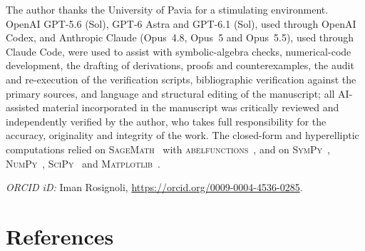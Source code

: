 \documentclass[12pt]{iopart}
\theoremstyle{plain}
\theoremstyle{definition}
\theoremstyle{plain}
\theoremstyle{remark}
\begin{document}
\ack
The author thanks the University of Pavia for a stimulating environment. OpenAI
GPT-5.6 (Sol), GPT-6 Astra and GPT-6.1 (Sol), used through OpenAI Codex, and Anthropic
Claude (Opus~4.8, Opus~5 and Opus~5.5), used through Claude Code, were used to assist with symbolic-algebra checks, numerical-code development,
the drafting of derivations, proofs and counterexamples, the audit and re-execution of the
verification scripts, bibliographic verification against the primary sources, and language
and structural editing of the manuscript; all AI-assisted material incorporated in the
manuscript was critically reviewed and independently verified by the author,
who takes full responsibility for the accuracy, originality and integrity of the work. The
closed-form and hyperelliptic computations relied on \textsc{SageMath}~\cite{SageMath}
with \textsc{abelfunctions}~\cite{abelfunctions}, and on
\textsc{SymPy}~\cite{SymPy}, \textsc{NumPy}~\cite{NumPy}, \textsc{SciPy}~\cite{SciPy} and
\textsc{Matplotlib}~\cite{Matplotlib}.

\medskip\noindent\textit{ORCID iD:} Iman Rosignoli,
\url{https://orcid.org/0009-0004-4536-0285}.

\section*{References}


\end{document}
